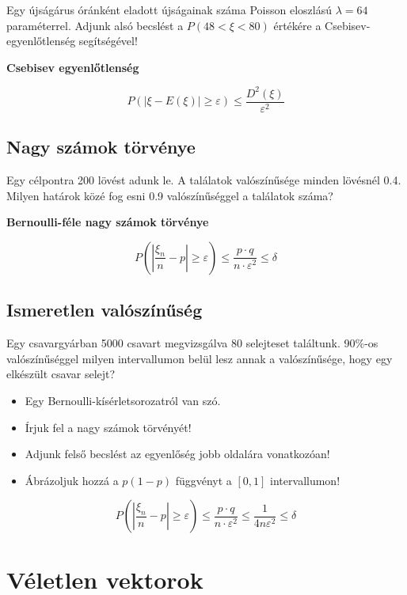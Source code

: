 \documentclass[a4paper]{article}
\begin{document}
Egy újságárus óránként eladott újságainak száma Poisson eloszlású $\lambda = 64$ paraméterrel.
Adjunk alsó becslést a $P(48 < \xi < 80)$ értékére a Csebisev-egyenlőtlenség segítségével!

\medskip

\textbf{Csebisev egyenlőtlenség}

\[
P(|\xi - E(\xi)| \geq \varepsilon) \leq \dfrac{D^2(\xi)}{\varepsilon^2}
\]

\subsection{Nagy számok törvénye}

Egy célpontra 200 lövést adunk le.
A találatok valószínűsége minden lövésnél 0.4.
Milyen határok közé fog esni 0.9 valószínűséggel a találatok száma?

\medskip

\textbf{Bernoulli-féle nagy számok törvénye}

\[
P\left(\left|\dfrac{\xi_{n}}{n} - p\right| \geq \varepsilon\right)
\leq \dfrac{p \cdot q}{n \cdot \varepsilon^2}
\leq \delta
\]

\subsection{Ismeretlen valószínűség}

Egy csavargyárban 5000 csavart megvizsgálva 80 selejteset találtunk.
90\%-os valószínűséggel milyen intervallumon belül lesz annak a valószínűsége, hogy egy elkészült csavar selejt?

\medskip

\begin{itemize}
\item Egy Bernoulli-kísérletsorozatról van szó.
\item Írjuk fel a nagy számok törvényét!
\item Adjunk felső becslést az egyenlőség jobb oldalára vonatkozóan!
\item Ábrázoljuk hozzá a $p(1 - p)$ függvényt a $[0, 1]$ intervallumon!
\end{itemize}

\[
P\left(\left|\dfrac{\xi_{n}}{n} - p\right| \geq \varepsilon\right)
\leq \dfrac{p \cdot q}{n \cdot \varepsilon^2}
\leq \dfrac{1}{4 n \varepsilon^2}
\leq \delta
\]

\section{Véletlen vektorok}
\end{document}
